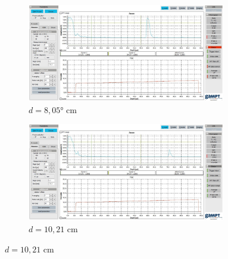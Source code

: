 \begin{figure}
  \begin{subfigure}{0.7\textwidth}
    \centering
    \includegraphics[width=0.95\textwidth]{screens/805.jpg}
    \caption{$d = 8,05°$ cm}
    \label{fig:90-deg}
  \end{subfigure}

  \begin{subfigure}{0.7\textwidth}
    \centering
    \includegraphics[width=0.95\textwidth]{screens/1021.jpg}
    \caption{$d = 10,21$ cm}
    \label{fig:135-deg}
  \end{subfigure}
  \label{fig: graphen}
\end{figure}


